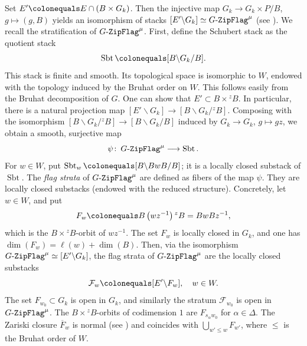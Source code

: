 \documentclass[10pt,a4paper]{article}
\numberwithin{equation}{section}
\theoremstyle{definition}
\theoremstyle{remark}
\newcommand{\GF}{\mathop{\text{$G$-{\tt ZipFlag}}}\nolimits}
\newcommand{\Fcal}{{\mathcal F}}
\DeclareMathOperator{\Sbt}{Sbt}
\newcommand{\lra}{\longrightarrow}
\begin{document}
Set $E' \colonequals E\cap (B\times G_k)$. Then the injective map $G_k \to G_k \times P/B$, $g\mapsto (g,B)$ yields an isomorphism of stacks $[E' \backslash G_k]\simeq \GF^\mu$ (see \cite[Equation~(2.1.5)]{Goldring-Koskivirta-Strata-Hasse}). We recall the stratification of $\GF^\mu$. First, define the Schubert stack as the quotient stack
\begin{equation}\label{equ-def-Sbt}
\Sbt \colonequals [B\backslash G_k /B].
\end{equation}
This stack is finite and smooth. Its topological space is isomorphic to $W$, endowed with the topology induced by the Bruhat order on $W$. This follows easily from the Bruhat decomposition of $G$. One can show that $E'\subset B\times {}^z B$. In particular, there is a natural projection map $[E'\backslash G_k]\to [B\backslash G_k/{}^z\! B]$. Composing with the isomorphism $[B\backslash G_k/{}^z B]\to [B\backslash G_k/B]$ induced by $G_k\to G_k$, $g\mapsto gz$, we obtain a smooth, surjective map
 \begin{equation}\label{eq-GF-to-Sbt}
     \psi  \colon  \GF^\mu \lra \Sbt.
 \end{equation}
For $w\in W$, put $\Sbt_w\colonequals [B\backslash BwB /B]$; it is a locally closed substack of $\Sbt$. The \emph{flag strata} of $\GF^\mu$ are defined as fibers of the map $\psi$. They are locally closed substacks (endowed with the reduced structure). Concretely, let $w\in W$, and put
\begin{equation}
F_w \colonequals B\left(wz^{-1}\right){}^zB=BwBz^{-1},
\end{equation} 
which is the $B\times {}^zB$-orbit of $wz^{-1}$. The set $F_w$ is locally closed in $G_k$, and one has $\dim(F_w)=\ell(w)+\dim(B)$. Then, via the isomorphism $\GF^\mu\simeq [E'\backslash G_k]$, the flag strata of $\GF^\mu$ are the locally closed substacks
\begin{equation}\label{zipflag-Cw}
\Fcal_w \colonequals [E'\backslash F_w], \quad w\in W.    
\end{equation}
The set $F_{w_0}\subset G_k$ is open in $G_k$, and similarly the stratum $\Fcal_{w_0}$ is open in $\GF^\mu$. The $B\times {}^zB$-orbits of codimension $1$ are $F_{s_\alpha w_0}$ for $\alpha\in \Delta$. The Zariski closure $\overline{F}_w$ is normal (see \cite[Theorem 3]{Ramanan-Ramanathan-projective-normality}) and coincides with $\bigcup_{w'\leq w}F_{w'}$, where $\leq$ is the Bruhat order of $W$.
\end{document}
